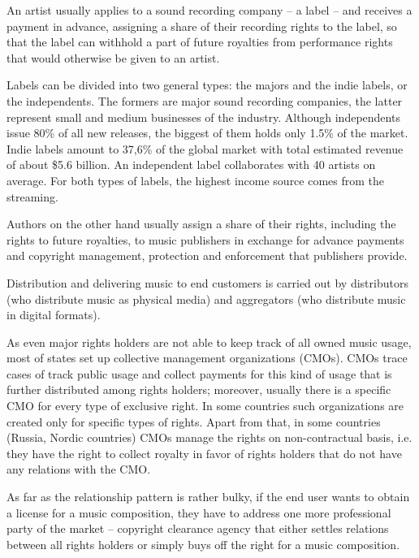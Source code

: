 \documentclass[12pt]{report}
\begin{document}
An artist usually applies to a sound recording company – a label – and receives a payment in advance, assigning a share of their recording rights to the label, so that the label can withhold a part of future royalties from performance rights that would otherwise be given to an artist.

Labels can be divided into two general types: the majors and the indie labels, or the independents. The formers are major sound recording companies, the latter represent small and medium businesses of the industry. Although independents issue 80\% of all new releases, the biggest of them holds only 1.5\% of the market. Indie labels amount to 37,6\% of the global market with total estimated revenue of about \$5.6 billion. An independent label collaborates with 40 artists on average. For both types of labels, the highest income source comes from the streaming.

Authors on the other hand usually assign a share of their rights, including the rights to future royalties, to music publishers in exchange for advance payments and copyright management, protection and enforcement that publishers provide.

Distribution and delivering music to end customers is carried out by distributors (who distribute music as physical media) and aggregators (who distribute music in digital formats).

As even major rights holders are not able to keep track of all owned music usage, most of states set up collective management organizations (CMOs). CMOs trace cases of track public usage and collect payments for this kind of usage that is further distributed among rights holders; moreover, usually there is a specific CMO for every type of exclusive right. In some countries such organizations are created only for specific types of rights. Apart from that, in some countries (Russia, Nordic countries) CMOs manage the rights on non-contractual basis, i.e. they have the right to collect royalty in favor of rights holders that do not have any relations with the CMO.

As far as the relationship pattern is rather bulky, if the end user wants to obtain a license for a music composition, they have to address one more professional party of the market – copyright clearance agency that either settles relations between all rights holders or simply buys off the right for a music composition.
\end{document}
